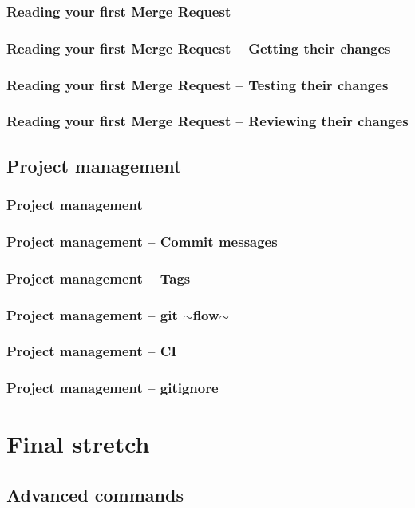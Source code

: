 \documentclass{beamer}
\begin{document}
\begin{frame}[fragile]
  \frametitle{Reading your first Merge Request}
\end{frame}

\begin{frame}[fragile]
  \frametitle{Reading your first Merge Request -- Getting their changes}
\end{frame}

\begin{frame}[fragile]
  \frametitle{Reading your first Merge Request -- Testing their changes}
\end{frame}

\begin{frame}[fragile]
  \frametitle{Reading your first Merge Request -- Reviewing their changes}  %
\end{frame}

\subsection{Project management}

\begin{frame}[fragile]
  \frametitle{Project management}
\end{frame}

\begin{frame}[fragile]
  \frametitle{Project management -- Commit messages}
\end{frame}

\begin{frame}[fragile]
  \frametitle{Project management -- Tags}
\end{frame}

\begin{frame}[fragile]
  \frametitle{Project management -- git $\sim$flow$\sim$}
\end{frame}

\begin{frame}[fragile]
  \frametitle{Project management -- CI} %
\end{frame}

\begin{frame}[fragile]
  \frametitle{Project management -- gitignore}
\end{frame}

\section{Final stretch}
\subsection{Advanced commands}
\end{document}
